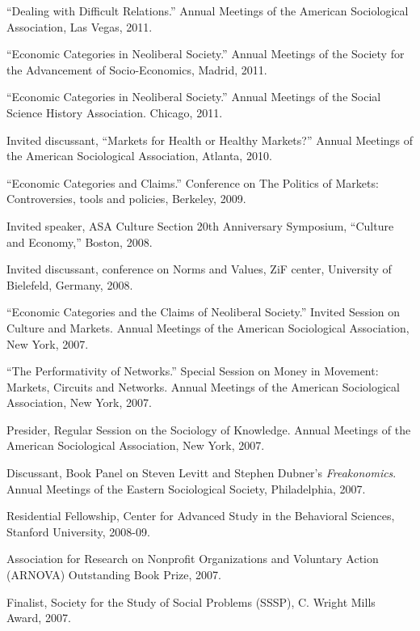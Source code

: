 \documentclass[11pt,article,oneside]{memoir}
\begin{document}
\ind ``Dealing with Difficult Relations.'' Annual Meetings of the American Sociological Association, Las Vegas, 2011.

\ind ``Economic Categories in Neoliberal Society.'' Annual Meetings of the Society for the Advancement of Socio-Economics, Madrid, 2011.

\ind ``Economic Categories in Neoliberal Society.'' Annual Meetings of the Social Science History Association. Chicago, 2011. 

\ind Invited discussant, ``Markets for Health or Healthy Markets?'' Annual Meetings of the American Sociological Association, Atlanta, 2010. 

\ind ``Economic Categories and Claims.'' Conference on The Politics of Markets: Controversies, tools and policies, Berkeley, 2009.

\ind Invited speaker, ASA Culture Section 20th Anniversary Symposium, ``Culture and Economy,'' Boston, 2008.

\ind Invited discussant, conference on Norms and Values, ZiF center, University of Bielefeld, Germany, 2008. 

\ind ``Economic Categories and the Claims of Neoliberal Society.'' Invited Session on Culture and Markets. Annual Meetings of the American Sociological Association, New York, 2007.

\ind ``The Performativity of Networks.'' Special Session on Money in Movement: Markets, Circuits and Networks. Annual Meetings of the American Sociological Association, New York, 2007.

\ind Presider, Regular Session on the Sociology of Knowledge. Annual Meetings of the American Sociological Association, New York, 2007. 

\ind Discussant, Book Panel on Steven Levitt and Stephen Dubner's \emph{Freakonomics}. Annual Meetings of the Eastern Sociological Society, Philadelphia, 2007. 

\bigskip 

\medskip

\ind Residential Fellowship, Center for Advanced Study in the Behavioral Sciences, Stanford University, 2008-09.

\ind Association for Research on Nonprofit Organizations and Voluntary Action (ARNOVA) Outstanding Book Prize, 2007.

\ind Finalist, Society for the Study of Social Problems (SSSP), C. Wright Mills Award, 2007.
\end{document}
